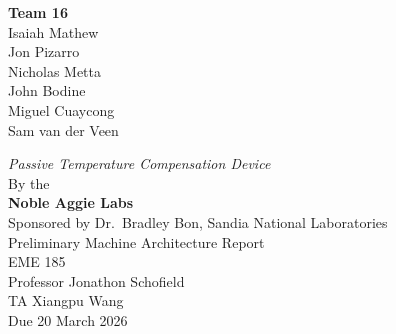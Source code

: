 \documentclass[12pt, letterpaper]{report}%
\newcounter{mycounter}           %
\newcounter{sub}[mycounter]      %
\newcommand{\projecttitle}{Passive Temperature Compensation Device}
\newcommand{\teamname}{Noble Aggie Labs}
\newcommand{\teamnumber}{16}
\newcommand{\sponsor}{Dr.\ Bradley Bon}
\newcommand{\organization}{Sandia National Laboratories}
\newcommand{\coursename}{EME 185}
\newcommand{\instructor}{Professor Jonathon Schofield}
\newcommand{\ta}{Xiangpu Wang}
\newcommand{\duedate}{20 March 2026}
\begin{document}
\newpage
\thispagestyle{empty}  %

\vspace*{1in}
\begin{center}
    {\Large\bfseries Team \teamnumber}\\[24pt]

    {\large
        Isaiah Mathew\\[8pt]
        Jon Pizarro\\[8pt]
        Nicholas Metta\\[8pt]
        John Bodine\\[8pt]
        Miguel Cuaycong\\[8pt]
        Sam van der Veen\\[8pt]
    }

    \vspace{0.6in}

    {\Large\itshape \projecttitle}\\[12pt]
    {\large By the}\\[12pt]
    {\Large\bfseries \teamname}\\[24pt]
    {\large Sponsored by \sponsor, \organization}\\[36pt]
    {\large Preliminary Machine Architecture Report}\\[12pt]
    {\large \coursename}\\[6pt]
    {\large \instructor}\\[6pt]
    {\large TA \ta}\\[12pt]
    {\large Due \duedate}
\end{center}


%
\end{document}

